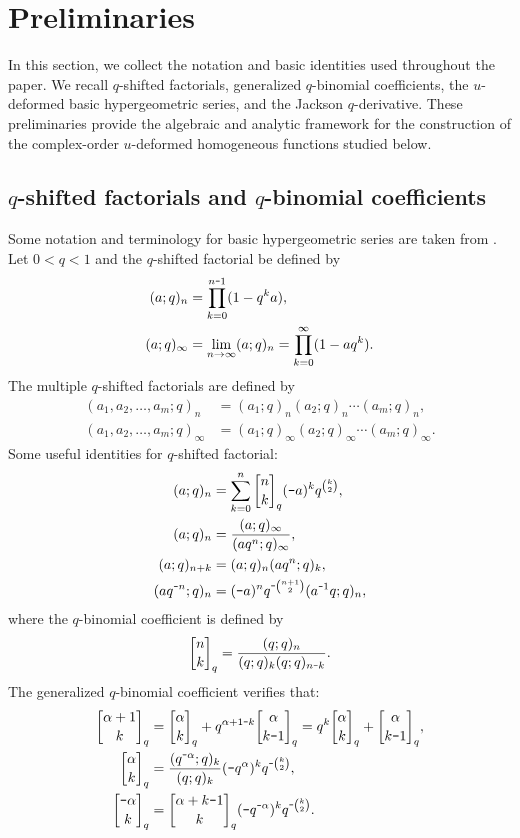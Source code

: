 \documentclass[12pt]{article}
\newcommand{\qbinom}{\genfrac{[}{]}{0pt}{}}
\newcommand{\minus}{\textup{\texttt{-}}}
\begin{document}
\section{Preliminaries}

In this section, we collect the notation and basic identities used throughout the paper. We recall \(q\)-shifted factorials, generalized \(q\)-binomial coefficients, the \(u\)-deformed basic hypergeometric series, and the Jackson \(q\)-derivative. These preliminaries provide the algebraic and analytic framework for the construction of the complex-order \(u\)-deformed homogeneous functions studied below.
\subsection{$q$-shifted factorials and $q$-binomial coefficients}
Some notation and terminology for basic hypergeometric series are taken from \cite{gasper}. Let $0<q<1$ and the $q$-shifted factorial be defined by
\begin{align*}
    (a;q)_{n}&=\prod_{k=0}^{n\minus1}(1-q^{k}a),\\
    (a;q)_{\infty}&=\lim_{n\rightarrow\infty}(a;q)_{n}=\prod_{k=0}^{\infty}(1-aq^{k}).
\end{align*}
The multiple $q$-shifted factorials are defined by
\begin{align*}
    (a_{1},a_{2},\ldots,a_{m};q)_{n}&=(a_{1};q)_{n}(a_{2};q)_{n}\cdots(a_{m};q)_{n},\\
    (a_{1},a_{2},\ldots,a_{m};q)_{\infty}&=(a_{1};q)_{\infty}(a_{2};q)_{\infty}\cdots(a_{m};q)_{\infty}.
\end{align*}
Some useful identities for $q$-shifted factorial:
\begin{align}
    (a;q)_{n}&=\sum_{k=0}^{n}\qbinom{n}{k}_{q}(\minus a)^{k}q^{\binom{k}{2}},\label{iden3}\\
    (a;q)_{n}&=\frac{(a;q)_{\infty}}{(aq^n;q)_{\infty}},\label{iden4}\\
    (a;q)_{n+k}&=(a;q)_{n}(aq^{n};q)_{k},\label{iden5}\\
    (aq^{\minus n};q)_{n}&=(\minus a)^nq^{\minus\binom{n+1}{2}}(a^{\minus1}q;q)_{n},\label{iden6}
\end{align}
where the $q$-binomial coefficient is defined by
\begin{equation*}
\qbinom{n}{k}_{q}=\frac{(q;q)_{n}}{(q;q)_{k}(q;q)_{n\minus k}}.
\end{equation*}
The generalized $q$-binomial coefficient verifies that:
\begin{align}
    \qbinom{\alpha+1}{k}_{q}&=\qbinom{\alpha}{k}_{q}+q^{\alpha+1\minus k}\qbinom{\alpha}{k\minus1}_{q}=
    q^{k}\qbinom{\alpha}{k}_{q}+\qbinom{\alpha}{k\minus1}_{q},\label{eqn_pascal}\\
    \qbinom{\alpha}{k}_{q}&=\frac{(q^{\minus\alpha};q)_{k}}{(q;q)_{k}}(\minus q^\alpha)^{k}q^{\minus\binom{k}{2}},\label{iden1}\\
    \qbinom{\minus\alpha}{k}_{q}&=\qbinom{\alpha+k\minus1}{k}_{q}(\minus q^{\minus\alpha})^kq^{\minus\binom{k}{2}}.\label{iden2}
\end{align}
\end{document}
